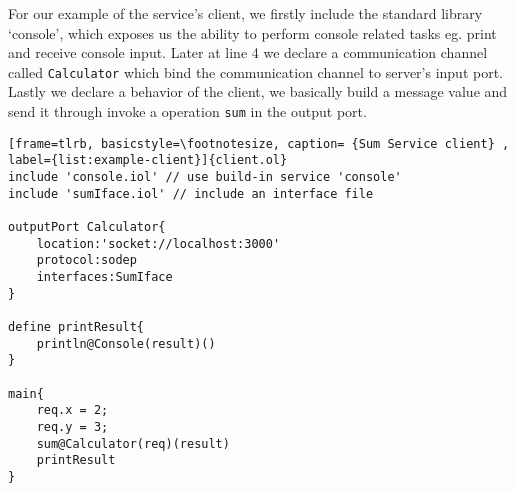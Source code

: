 For our example of the service's client, we firstly include the standard library `console', which exposes us the ability to perform console related tasks eg. print and receive console input. Later at line 4 we declare a communication channel called \texttt{Calculator} which bind the communication channel to server's input port. Lastly we declare a behavior of the client, we basically build a message value and send it through invoke a operation \texttt{sum} in the output port.

\begin{listing}[ht]
    \lstset{language=Jolie,
        style=codeStyle,
        numbers=left,
        firstnumber=1
    }
\begin{lstlisting}[frame=tlrb, basicstyle=\footnotesize, caption= {Sum Service client} , label={list:example-client}]{client.ol}
include 'console.iol' // use build-in service 'console'
include 'sumIface.iol' // include an interface file 

outputPort Calculator{
    location:'socket://localhost:3000'
    protocol:sodep 
    interfaces:SumIface
}

define printResult{
    println@Console(result)()
}

main{
    req.x = 2;
    req.y = 3;
    sum@Calculator(req)(result)
    printResult
}
\end{lstlisting}
\end{listing}

\FloatBarrier
